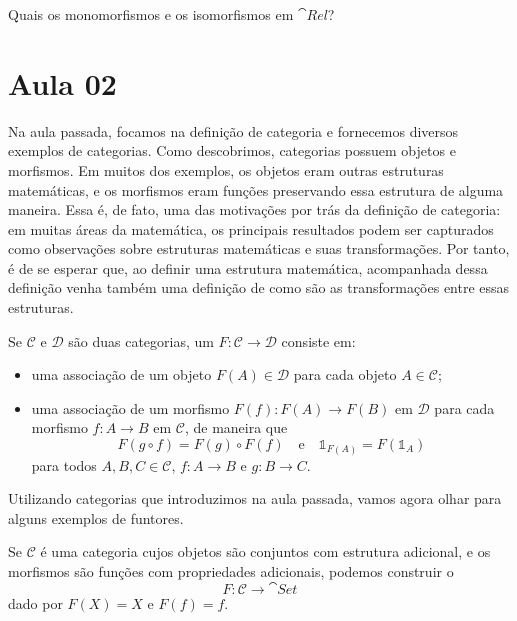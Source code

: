 \begin{exercicio}
    Quais os monomorfismos e os isomorfismos em $\cat{Rel}$?
\end{exercicio}

\section{Aula 02}

Na aula passada, focamos na definição de categoria e fornecemos diversos exemplos de categorias. Como descobrimos, categorias possuem objetos e morfismos. Em muitos dos exemplos, os objetos eram outras estruturas matemáticas, e os morfismos eram funções preservando essa estrutura de alguma maneira. Essa é, de fato, uma das motivações por trás da definição de categoria: em muitas áreas da matemática, os principais resultados podem ser capturados como observações sobre estruturas matemáticas e suas transformações. Por tanto, é de se esperar que, ao definir uma estrutura matemática, acompanhada dessa definição venha também uma definição de como são as transformações entre essas estruturas.

\begin{definicao}
    Se $\mathcal{C}$ e $\mathcal{D}$ são duas categorias, um  $F \colon \mathcal{C} \to \mathcal{D}$ consiste em: \begin{itemize}
        \item uma associação de um objeto $F(A) \in \mathcal{D}$ para cada objeto $A \in \mathcal{C}$;
        \item uma associação de um morfismo $F(f) \colon F(A) \to F(B)$ em $\mathcal{D}$ para cada morfismo $f \colon A \to B$ em $\mathcal{C}$, de maneira que \begin{equation}
            F(g \circ f) = F(g) \circ F(f) \quad \text{e} \quad \mathbb{1}_{F(A)} = F(\mathbb{1}_A)
        \end{equation} para todos $A, B, C \in \mathcal{C}$, $f \colon A \to B$ e $g \colon B \to C$.
    \end{itemize}
\end{definicao}

Utilizando categorias que introduzimos na aula passada, vamos agora olhar para alguns exemplos de funtores.

\begin{definicao}
    Se $\mathcal{C}$ é uma categoria cujos objetos são conjuntos com estrutura adicional, e os morfismos são funções com propriedades adicionais, podemos construir o  \begin{equation}
        F \colon \mathcal{C} \to \cat{Set}
    \end{equation} dado por $F(X) = X$ e $F(f) = f$.
\end{definicao}

